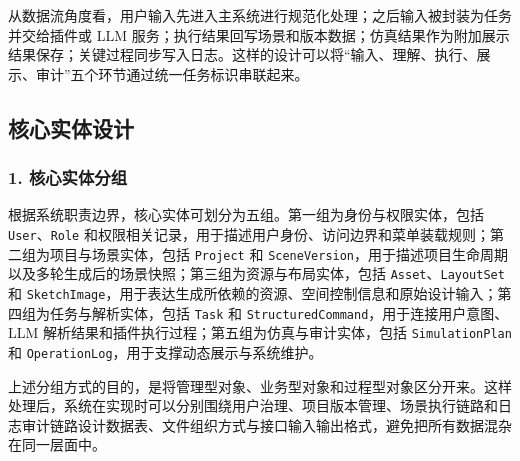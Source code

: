 从数据流角度看，用户输入先进入主系统进行规范化处理；之后输入被封装为任务并交给插件或 LLM 服务；执行结果回写场景和版本数据；仿真结果作为附加展示结果保存；关键过程同步写入日志。这样的设计可以将“输入、理解、执行、展示、审计”五个环节通过统一任务标识串联起来。

\subsection{核心实体设计}
\subsubsection*{1. 核心实体分组}
根据系统职责边界，核心实体可划分为五组。第一组为身份与权限实体，包括 \texttt{User}、\texttt{Role} 和权限相关记录，用于描述用户身份、访问边界和菜单装载规则；第二组为项目与场景实体，包括 \texttt{Project} 和 \texttt{SceneVersion}，用于描述项目生命周期以及多轮生成后的场景快照；第三组为资源与布局实体，包括 \texttt{Asset}、\texttt{LayoutSet} 和 \texttt{SketchImage}，用于表达生成所依赖的资源、空间控制信息和原始设计输入；第四组为任务与解析实体，包括 \texttt{Task} 和 \texttt{StructuredCommand}，用于连接用户意图、LLM 解析结果和插件执行过程；第五组为仿真与审计实体，包括 \texttt{SimulationPlan} 和 \texttt{OperationLog}，用于支撑动态展示与系统维护。

上述分组方式的目的，是将管理型对象、业务型对象和过程型对象区分开来。这样处理后，系统在实现时可以分别围绕用户治理、项目版本管理、场景执行链路和日志审计链路设计数据表、文件组织方式与接口输入输出格式，避免把所有数据混杂在同一层面中。

